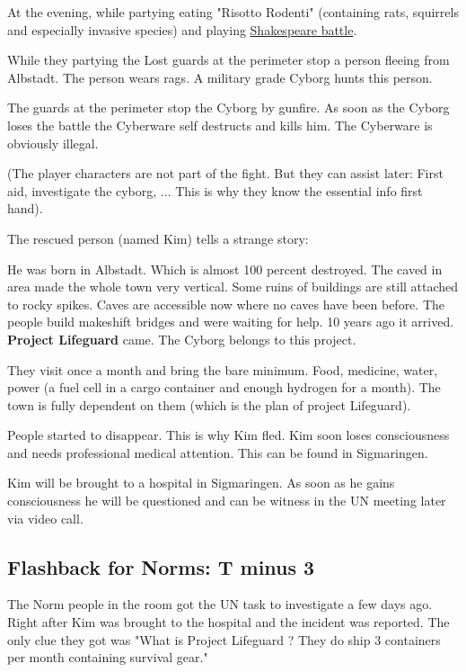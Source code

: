 At the evening, while partying eating "Risotto Rodenti" (containing rats, squirrels and especially invasive species) and playing \hyperref[sec:Shakespeare battle]{Shakespeare battle}.

While they partying the Lost guards at the perimeter stop a person fleeing from Albstadt. The person wears rags. A military grade Cyborg hunts this person.

The guards at the perimeter stop the Cyborg by gunfire. As soon as the Cyborg loses the battle the Cyberware self destructs and kills him. The Cyberware is obviously illegal.

(The player characters are not part of the fight. But they can assist later: First aid, investigate the cyborg, ... This is why they know the essential info first hand).

The rescued person (named Kim) tells a strange story:

He was born in Albstadt. Which is almost 100 percent destroyed. The caved in area made the whole town very vertical. Some ruins of buildings are still attached to rocky spikes. Caves are accessible now where no caves have been before. The people build makeshift bridges and were waiting for help. 10 years ago it arrived. \textbf{Project Lifeguard} came. The Cyborg belongs to this project.

They visit once a month and bring the bare minimum. Food, medicine, water, power (a fuel cell in a cargo container and enough hydrogen for a month). The town is fully dependent on them (which is the plan of project Lifeguard).

People started to disappear. This is why Kim fled. Kim soon loses consciousness and needs professional medical attention. This can be found in Sigmaringen.

Kim will be brought to a hospital in Sigmaringen. As soon as he gains consciousness he will be questioned and can be witness in the UN meeting later via video call.

\subsection{Flashback for Norms: T minus 3}

The Norm people in the room got the UN task to investigate a few days ago. Right after Kim was brought to the hospital and the incident was reported. The only clue they got was "What is Project Lifeguard ? They do ship 3 containers per month containing survival gear."

